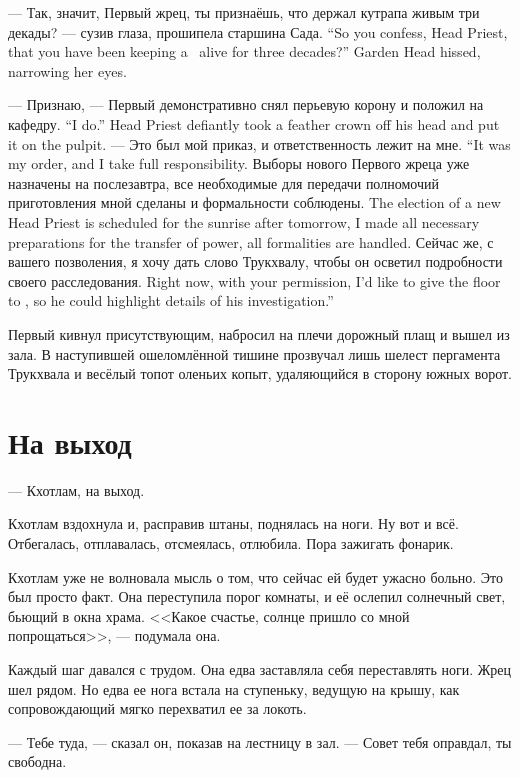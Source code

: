 {--- Так, значит, Первый жрец, ты признаёшь, что держал кутрапа живым три декады? --- сузив глаза, прошипела старшина Сада.}
{``So you confess, Head Priest, that you have been keeping a \kutraph\ alive for three decades?'' Garden Head hissed, narrowing her eyes.}

{--- Признаю, --- Первый демонстративно снял перьевую корону и положил на кафедру.}
{``I do.'' Head Priest defiantly took a feather crown off his head and put it on the pulpit.}
{--- Это был мой приказ, и ответственность лежит на мне.}
{``It was my order, and I take full responsibility.}
{Выборы нового Первого жреца уже назначены на послезавтра, все необходимые для передачи полномочий приготовления мной сделаны и формальности соблюдены.}
{The election of a new Head Priest is scheduled for the sunrise after tomorrow, I made all necessary preparations for the transfer of power, all formalities are handled.}
{Сейчас же, с вашего позволения, я хочу дать слово Трукхвалу, чтобы он осветил подробности своего расследования.}
{Right now, with your permission, I'd like to give the floor to \Trukchual, so he could highlight details of his investigation.''}

Первый кивнул присутствующим, набросил на плечи дорожный плащ и вышел из зала.
В наступившей ошеломлённой тишине прозвучал лишь шелест пергамента Трукхвала и весёлый топот оленьих копыт, удаляющийся в сторону южных ворот.

\section{На выход}

--- Кхотлам, на выход.

Кхотлам вздохнула и, расправив штаны, поднялась на ноги.
Ну вот и всё.
Отбегалась, отплавалась, отсмеялась, отлюбила.
Пора зажигать фонарик.

Кхотлам уже не волновала мысль о том, что сейчас ей будет ужасно больно.
Это был просто факт.
Она переступила порог комнаты, и её ослепил солнечный свет, бьющий в окна храма.
<<Какое счастье, солнце пришло со мной попрощаться>>, --- подумала она.

Каждый шаг давался с трудом.
Она едва заставляла себя переставлять ноги.
Жрец шел рядом.
Но едва ее нога встала на ступеньку, ведущую на крышу, как сопровождающий мягко перехватил ее за локоть.

--- Тебе туда, --- сказал он, показав на лестницу в зал.
--- Совет тебя оправдал, ты свободна.

